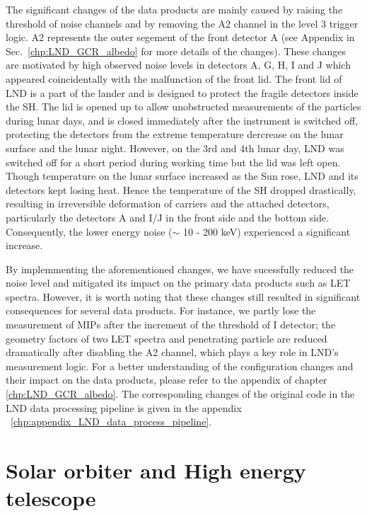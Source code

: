 The significant changes of the data products are mainly caused by raising the threshold of noise channels and by removing the A2 channel in the level 3 trigger logic. A2 represents the outer segement of the front detector A (see Appendix in Sec.~\ref{chp:LND_GCR_albedo} for more details of the changes). These changes are motivated by high observed noise levels in detectors A, G, H, I and J which appeared coincidentally with the malfunction of the front lid. The front lid of \ac{LND} is a part of the lander and is designed to protect the fragile detectors inside the \ac{SH}. The lid is opened up to allow unobstructed measurements of the particles during lunar days, and is closed immediately after the instrument is switched off, protecting the detectors from the extreme temperature dercrease on the lunar surface and the lunar night. However, on the 3rd and 4th lunar day, \ac{LND} was switched off for a short period during working time but the lid was left open. Though temperature on the lunar surface increased as the Sun rose, \ac{LND} and its detectors kept losing heat. Hence the temperature of the \ac{SH} dropped drastically, resulting in irreversible deformation of carriers and the attached detectors, particularly the detectors A and I/J in the front side and the bottom side. Consequently, the lower energy noise ($\sim$ 10 - 200 keV) experienced a significant increase.

By implemmenting the aforementioned changes, we have sucessfully reduced the noise level and mitigated its impact on the primary data products such as \ac{LET} spectra. However, it is worth noting that these changes still resulted in significant consequences for several data products. For instance, we partly lose the measurement of \acp{MIP} after the increment of the threshold of I detector; the geometry factors of two \ac{LET} spectra and penetrating particle are reduced dramatically after disabling the A2 channel, which plays a key role in \ac{LND}'s measurement logic. For a better understanding of the configuration changes and their impact on the data products, please refer to the appendix of chapter \ref{chp:LND_GCR_albedo}.
The corresponding changes of the original code in the LND data processing pipeline is given in the appendix ~\ref{chp:appendix_LND_data_process_pipeline}.

\section{Solar orbiter and High energy telescope}

